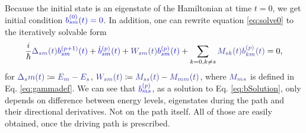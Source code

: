 Because the initial state is an eigenstate of the Hamiltonian at time $t=0$, we get initial condition $\blue{b_{sm}^{(0)}(t)=0}$. In addition, one can rewrite equation \ref{eq:solve0} to the iteratively solvable form
\begin{equation}
    \frac{i}{\hbar}\bluee{\Delta_{sm}(t)}\blue{b_{sm}^{(p+1)}(t)}+\blue{\dot b_{sm}^{(p)}(t)}+\bluee{W_{sm}(t)} \blue{b_{sm}^{(p)}(t)}+\sum_{k=0,k\neq s}\bluee{M_{sk}(t)}\bluee{b_{km}^{(p)}(t)}=0,
    \label{eq:bSolution}
\end{equation}
for $\bluee{\Delta_sm(t)}\coloneqq \bluee{E_m-E_s}$, $\bluee{W_{sm}(t)}\coloneqq \bluee{M_{ss}(t)}-\bluee{M_{mm}(t)}$, where $\bluee{M_{ms}}$ is defined in Eq. \ref{eq:gammadef}. We can see that $\blue{b_{ms}^{(p)}}$, as a solution to Eq. \ref{eq:bSolution}, only depends on difference between energy levels, eigenstates during the path and their directional derivatives. Not on the path itself. All of those are easily obtained, once the driving path is prescribed.




















